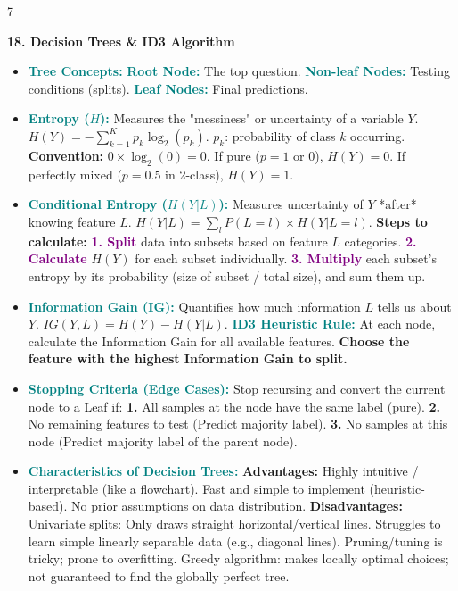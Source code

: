 \documentclass{article}
\newcommand{\hlhighlight}[1]{\par\vspace{1.5pt}\noindent\colorbox{yellow!50}{\parbox{\dimexpr\columnwidth-2\fboxsep\relax}{\textbf{#1}}}\par\vspace{0.5pt}}
\newcommand{\sectitle}[1]{\par\textbf{\color{blue!70!black}{#1}}\par}
\newcommand{\concept}[1]{\textcolor{teal}{\textbf{#1}}}
\newcommand{\procname}[1]{\textcolor{purple}{\textbf{#1}}}
\newcommand{\category}[1]{\textcolor{green!60!black}{\textbf{#1}}}
\newcommand{\lbl}[1]{\textcolor{green!60!black}{\textbf{#1}}}
\begin{document}
\begin{multicols}{7}
\hlhighlight{18. Decision Trees \& ID3 Algorithm}
\sectitle{Tree Concepts \& Metrics}
\begin{itemize}
    \item \concept{Tree Concepts:} \concept{Root Node:} The top question. \concept{Non-leaf Nodes:} Testing conditions (splits). \concept{Leaf Nodes:} Final predictions.
    \item \concept{Entropy ($H$):} Measures the "messiness" or uncertainty of a variable $Y$. $H(Y) = - \sum_{k=1}^K p_k \log_2(p_k)$. $p_k$: probability of class $k$ occurring. \lbl{Convention:} $0 \times \log_2(0) = 0$. If pure ($p=1$ or $0$), $H(Y) = 0$. If perfectly mixed ($p=0.5$ in 2-class), $H(Y) = 1$.
    \item \concept{Conditional Entropy ($H(Y|L)$):} Measures uncertainty of $Y$ *after* knowing feature $L$. $H(Y|L) = \sum_{l} P(L=l) \times H(Y|L=l)$. \lbl{Steps to calculate:} \procname{1. Split} data into subsets based on feature $L$ categories. \procname{2. Calculate} $H(Y)$ for each subset individually. \procname{3. Multiply} each subset's entropy by its probability (size of subset / total size), and sum them up.
    \item \concept{Information Gain (IG):} Quantifies how much information $L$ tells us about $Y$. $IG(Y, L) = H(Y) - H(Y|L)$. \concept{ID3 Heuristic Rule:} At each node, calculate the Information Gain for all available features. \lbl{Choose the feature with the highest Information Gain to split.}
\end{itemize}
\sectitle{Stopping Criteria \& Characteristics}
\begin{itemize}
    \item \concept{Stopping Criteria (Edge Cases):} Stop recursing and convert the current node to a Leaf if: \lbl{1.} All samples at the node have the same label (pure). \lbl{2.} No remaining features to test (Predict majority label). \lbl{3.} No samples at this node (Predict majority label of the parent node).
    \item \concept{Characteristics of Decision Trees:} \category{Advantages:} Highly intuitive / interpretable (like a flowchart). Fast and simple to implement (heuristic-based). No prior assumptions on data distribution. \category{Disadvantages:} Univariate splits: Only draws straight horizontal/vertical lines. Struggles to learn simple linearly separable data (e.g., diagonal lines). Pruning/tuning is tricky; prone to overfitting. Greedy algorithm: makes locally optimal choices; not guaranteed to find the globally perfect tree.
\end{itemize}


\end{multicols}
\end{document}
